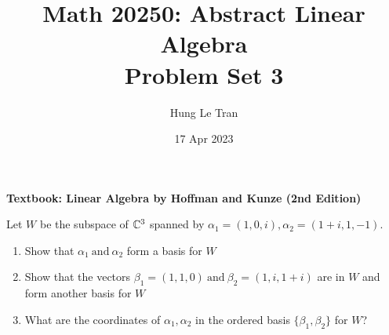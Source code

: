 \documentclass[a4paper, 10pt]{article}
\title{Math 20250: Abstract Linear Algebra \\ \large Problem Set 3}
\date{17 Apr 2023}
\author{Hung Le Tran}
\begin{document}
\maketitle
\newpage
\setcounter{section}{3}
\textbf{Textbook: Linear Algebra by Hoffman and Kunze (2nd Edition)}
\begin{problem} 
    Let \(W\) be the subspace of \(\mathbb{C}^3\) spanned by \(\alpha_1 = (1, 0, i), \alpha_2 = (1+i, 1, -1)\). \begin{enumerate} [label=(\alph*)]
        \item Show that \(\alpha_1 \:\text{and}\: \alpha_2 \) form a basis for \(W\)
        \item Show that the vectors \(\beta_1 = (1, 1, 0) \:\text{and}\: \beta_2 = (1, i, 1+i)\) are in \(W\) and form another basis for \(W\)
        \item What are the coordinates of \(\alpha_1, \alpha_2\) in the ordered basis \(\{\beta_1, \beta_2\}\) for \(W\)?
    \end{enumerate}
\end{problem}
\end{document}
